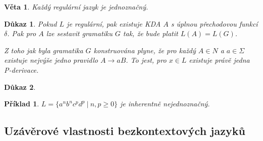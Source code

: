 \documentclass[10pt, a4paper, titlepage]{article}
\theoremstyle{note}
\newtheorem{veta}{\textbf{Věta}}
\newtheorem{dukaz}{\textbf{Důkaz}}
\newtheorem{priklad}{\textbf{Příklad}}
\begin{document}
\begin{veta}
Každý regulární jazyk je jednoznačný.
\end{veta}

\begin{dukaz}
Pokud $L$ je regulární, pak existuje KDA $A$ s úplnou přechodovou funkcí $\delta$. Pak pro $A$ lze sestavit gramatiku $G$ tak, že bude platit $L(A) = L(G)$.

Z toho jak byla gramatika $G$ konstruována plyne, že pro každý $A \in N$ a $a\in\Sigma$ existuje nejvýše jedno pravidlo $A \rightarrow aB$. To jest, pro $x \in L$ existuje právě jedna P-derivace.
\end{dukaz}

\begin{dukaz}

\end{dukaz}

\begin{priklad}
$L=\lbrace a^nb^nc^pd^p\ |\ n,p\ge 0\rbrace$ je inherentně nejednoznačný.
\end{priklad}

\subsection{Uzávěrové vlastnosti bezkontextových jazyků}
\end{document}

